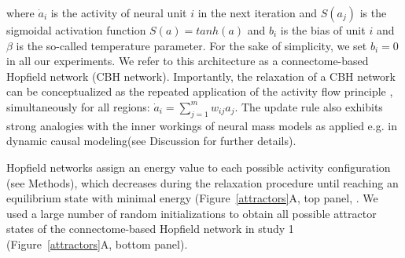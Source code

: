 \documentclass{article}
\begin{document}
where $\dot{a}_i$ is the activity of neural unit $i$ in the next iteration and $S(a_j)$ is the sigmoidal activation
function $S(a) = tanh(a)$ and $b_i$ is the bias of unit $i$ and $\beta$ is the so-called temperature parameter. For
the sake of simplicity, we set $b_i=0$ in all our experiments. We refer to this architecture as a connectome-based
Hopfield network (CBH network). Importantly, the relaxation of a CBH network can be conceptualized as the repeated
application of the activity flow principle \citep{cole2016activity, ito2017cognitive} , simultaneously for all
regions: $\dot{a}_i = \sum_{j=1}^m w_{ij}a_j$. The update rule also exhibits strong analogies with the inner workings
of neural mass models \citep{breakspear2017dynamic} as applied e.g. in dynamic causal modeling(see Discussion for
further details).

Hopfield networks assign an energy value to each possible activity configuration (see Methods), which decreases during
the relaxation procedure until reaching an equilibrium state with minimal energy (Figure~\ref{attractors}A, top panel,
\citep{hopfield1982neural, koiran1994dynamics}.
We used a large number of random initializations to obtain all possible attractor states of the connectome-based
Hopfield network in study 1 (Figure~\ref{attractors}A, bottom panel).
\end{document}
